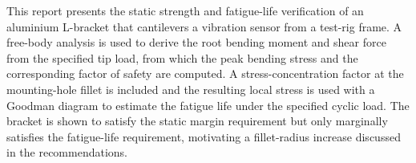 This report presents the static strength and fatigue-life verification of an
aluminium L-bracket that cantilevers a vibration sensor from a test-rig
frame. A free-body analysis is used to derive the root bending moment and
shear force from the specified tip load, from which the peak bending stress
and the corresponding factor of safety are computed. A stress-concentration
factor at the mounting-hole fillet is included and the resulting local stress
is used with a Goodman diagram to estimate the fatigue life under the
specified cyclic load. The bracket is shown to satisfy the static margin
requirement but only marginally satisfies the fatigue-life requirement,
motivating a fillet-radius increase discussed in the recommendations.
